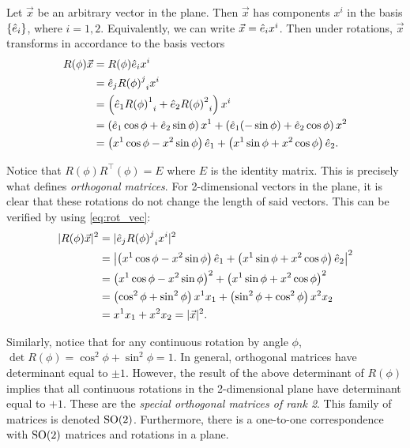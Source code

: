    Let $\vec{x}$ be an arbitrary vector in the plane. Then $\vec{x}$ has components $x^i$ in the basis $\{\hat{e}_i\}$, where $i=1,2$. Equivalently, we can write $\vec{x}=\hat{e}_i x^i$. Then under rotations, $\vec{x}$ transforms in accordance to the basis vectors
    \begin{align}
        R(\phi)\vec{x} &= R(\phi)\hat{e}_i x^i \label{eq:rot_vec} \\
        &= \hat{e}_j{{R(\phi)}^j}_i x^i \nonumber \\
        &= \left( \hat{e}_1{{R(\phi)}^1}_i + \hat{e}_2{{R(\phi)}^2}_i \right)x^i \nonumber \\
        &= \left( \hat{e}_1\cos\phi + \hat{e}_2\sin\phi \right) x^1 + \left( \hat{e}_1(-\sin\phi) + \hat{e}_2\cos\phi \right) x^2 \nonumber \\
        &= \left( x^1\cos\phi - x^2\sin\phi \right)\hat{e}_1 + \left( x^1\sin\phi + x^2\cos\phi \right)\hat{e}_2.  \nonumber
    \end{align}

    Notice that $R(\phi)R^\top(\phi) = E$ where $E$ is the identity matrix. This is precisely what defines \textit{orthogonal matrices}. For 2-dimensional vectors in the plane, it is clear that these rotations do not change the length of said vectors. This can be verified by using \cref{eq:rot_vec}:
    \begin{align}
        |R(\phi)\vec{x}|^2 &= |\hat{e}_j{{R(\phi)}^j}_i x^i|^2 \\
        &= \left|\left( x^1\cos\phi - x^2\sin\phi \right)\hat{e}_1 + \left( x^1\sin\phi + x^2\cos\phi \right)\hat{e}_2\right|^2 \nonumber \\
        &= {\left( x^1\cos\phi - x^2\sin\phi \right)}^2 + {\left( x^1\sin\phi + x^2\cos\phi \right)}^2 \nonumber \\
        &= \left( \cos^2\phi + \sin^2\phi \right)x^1 x_1 + \left( \sin^2\phi + \cos^2\phi \right)x^2 x_2 \nonumber \\
        &= x^1 x_1 + x^2 x_2 = |\vec{x}|^2. \nonumber
    \end{align}

    Similarly, notice that for any continuous rotation by angle $\phi$, $\det R(\phi) = \cos^2\phi+\sin^2\phi = 1$. In general, orthogonal matrices have determinant equal to $\pm1$. However, the result of the above determinant of $R(\phi)$ implies that all continuous rotations in the 2-dimensional plane have determinant equal to $+1$. These are the \textit{special orthogonal matrices of rank 2}. This family of matrices is denoted $\textrm{SO}{(2)}$. Furthermore, there is a one-to-one correspondence with $\textrm{SO}{(2)}$ matrices and rotations in a plane.

